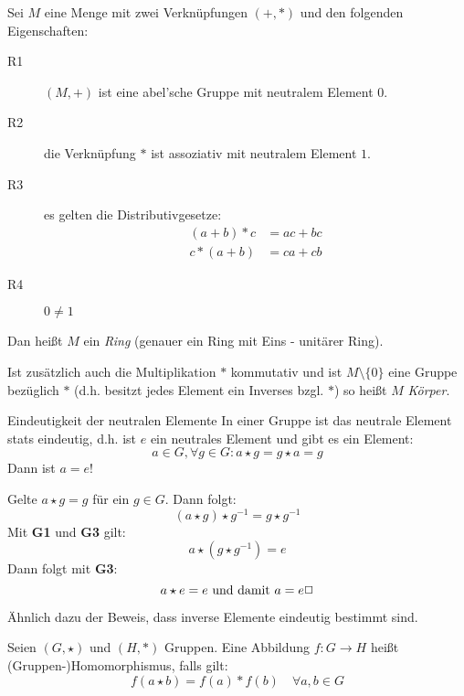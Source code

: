 Sei $M$ eine Menge mit zwei Verknüpfungen $(+,*)$ und den folgenden Eigenschaften:
\begin{description}
  \item[R1] $(M,+)$ ist eine abel'sche Gruppe mit neutralem Element $0$.
  \item[R2] die Verknüpfung $*$ ist assoziativ mit neutralem Element $1$.
  \item[R3] es gelten die Distributivgesetze:
  \begin{align*}
    (a+b)* c&=ac+bc\\
    c*(a+b)&=ca+cb
  \end{align*}
  \item[R4] $0\neq 1$
\end{description}
Dan heißt $M$ ein \emph{Ring} (genauer ein Ring mit Eins - unitärer Ring).

\vspace{1em}
Ist zusätzlich auch die Multiplikation $*$ kommutativ und ist $M\setminus\{0\}$ eine Gruppe bezüglich $*$ (d.h. besitzt jedes Element ein Inverses bzgl. $*$) so heißt $M$ \emph{Körper}.

\begin{satz}{Eindeutigkeit der neutralen Elemente}
  In einer Gruppe ist das neutrale Element stats eindeutig, d.h. ist $e$ ein neutrales Element und gibt es ein Element:
  \begin{equation*}
    a\in G, \forall g\in G : a\star g = g\star a = g
  \end{equation*}
  Dann ist $a = e$!
\end{satz}


\beweis
Gelte $a\star g = g$ für ein $g\in G$. Dann folgt:
\begin{equation*}
  (a\star g)\star g^{-1}=g\star g^{-1}
\end{equation*}
Mit \textbf{G1} und \textbf{G3} gilt:
\begin{equation*}
  a\star (g\star g^{-1})=e
\end{equation*}
Dann folgt mit \textbf{G3}:
\begin{equation*}
  a\star e=e \text{ und damit } a=e \hfill\Box
\end{equation*}

\bemerkung
Ähnlich dazu der Beweis, dass inverse Elemente eindeutig bestimmt sind.


Seien $(G,\star)$ und $(H,\ast)$ Gruppen. Eine Abbildung $f:G\rightarrow H$ heißt (Gruppen-)Homomorphismus, falls gilt:
\begin{equation*}
  f(a\star b)=f(a)\ast f(b)\quad\forall a,b\in G
\end{equation*}

